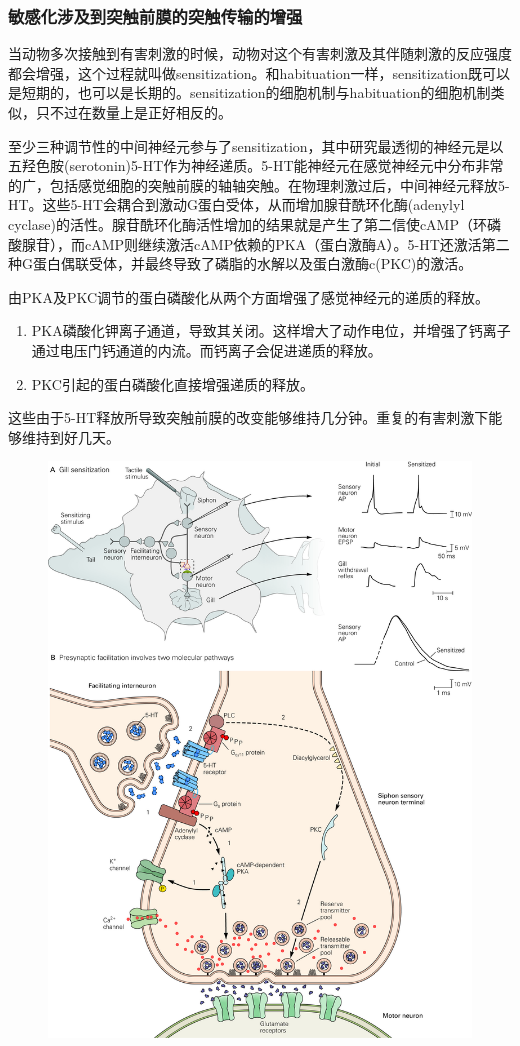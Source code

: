 \documentclass[UTF8,nofonts]{ctexart}
\begin{document}
\subsubsection{敏感化涉及到突触前膜的突触传输的增强}
当动物多次接触到有害刺激的时候，动物对这个有害刺激及其伴随刺激的反应强度都会增强，这个过程就叫做sensitization。和habituation一样，sensitization既可以是短期的，也可以是长期的。sensitization的细胞机制与habituation的细胞机制类似，只不过在数量上是正好相反的。
\par
至少三种调节性的中间神经元参与了sensitization，其中研究最透彻的神经元是以五羟色胺(serotonin)5-HT作为神经递质。5-HT能神经元在感觉神经元中分布非常的广，包括感觉细胞的突触前膜的轴轴突触。在物理刺激过后，中间神经元释放5-HT。这些5-HT会耦合到激动G蛋白受体，从而增加腺苷酰环化酶(adenylyl cyclase)的活性。腺苷酰环化酶活性增加的结果就是产生了第二信使cAMP（环磷酸腺苷），而cAMP则继续激活cAMP依赖的PKA（蛋白激酶A）。5-HT还激活第二种G蛋白偶联受体，并最终导致了磷脂的水解以及蛋白激酶c(PKC)的激活。
\par
由PKA及PKC调节的蛋白磷酸化从两个方面增强了感觉神经元的递质的释放。
\begin{enumerate}
	
	\item  PKA磷酸化钾离子通道，导致其关闭。这样增大了动作电位，并增强了钙离子通过电压门钙通道的内流。而钙离子会促进递质的释放。
	\item PKC引起的蛋白磷酸化直接增强递质的释放。
\end{enumerate}
这些由于5-HT释放所导致突触前膜的改变能够维持几分钟。重复的有害刺激下能够维持到好几天。
\begin{figure}
	\centering
	\includegraphics[scale=0.8]{Pic/6604_PNS5.jpg}
\end{figure}
\end{document}
